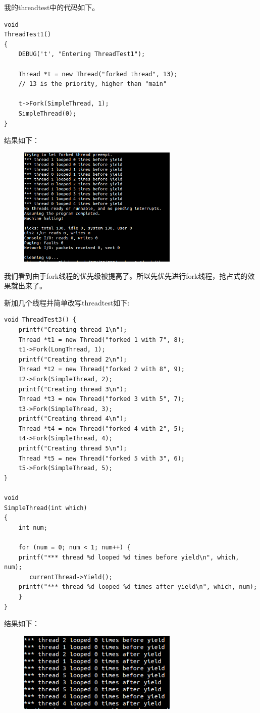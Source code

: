 \documentclass[nofonts]{ctexart}
\begin{document}
我的threadtest中的代码如下。
\begin{lstlisting}
void
ThreadTest1()
{
    DEBUG('t', "Entering ThreadTest1");

    Thread *t = new Thread("forked thread", 13); 
    // 13 is the priority, higher than "main"

    t->Fork(SimpleThread, 1);
    SimpleThread(0);
}
\end{lstlisting}
结果如下：
\begin{figure}[h]
 \centering
\includegraphics[width=3in]{ex22.png}
\end{figure}

我们看到由于fork线程的优先级被提高了。所以先优先进行fork线程，抢占式的效果就出来了。

新加几个线程并简单改写threadtest如下:
\begin{lstlisting}
void ThreadTest3() {
    printf("Creating thread 1\n");
    Thread *t1 = new Thread("forked 1 with 7", 8);
    t1->Fork(LongThread, 1);
    printf("Creating thread 2\n");
    Thread *t2 = new Thread("forked 2 with 8", 9);
    t2->Fork(SimpleThread, 2);
    printf("Creating thread 3\n");
    Thread *t3 = new Thread("forked 3 with 5", 7);
    t3->Fork(SimpleThread, 3);
    printf("Creating thread 4\n");
    Thread *t4 = new Thread("forked 4 with 2", 5);
    t4->Fork(SimpleThread, 4);
    printf("Creating thread 5\n");
    Thread *t5 = new Thread("forked 5 with 3", 6);
    t5->Fork(SimpleThread, 5);
}

void
SimpleThread(int which)
{
    int num;
    
    for (num = 0; num < 1; num++) {
	printf("*** thread %d looped %d times before yield\n", which, num);
       currentThread->Yield();
	printf("*** thread %d looped %d times after yield\n", which, num);
    }
}
\end{lstlisting}

结果如下：
\begin{figure}[h]
 \centering
\includegraphics[width=3in]{ex23.png}
\end{figure}
\end{document}
